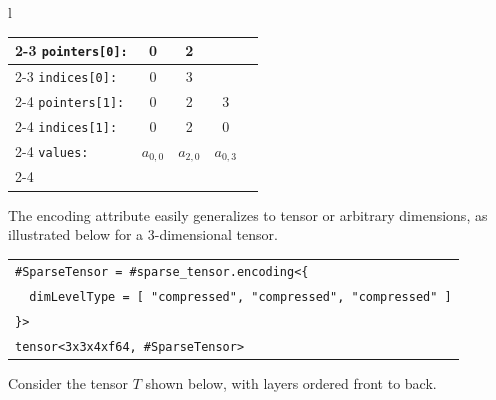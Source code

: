 \documentclass[10pt]{article}
\newcommand{\exam}{\begin{flushleft}\scriptsize\begin{tabular}{l}}
\newcommand{\maxe}{\end{tabular}\end{flushleft}}
\begin{document}
\exam
\begin{tabular}{l|c|c|c|c|}
\cline{2-3}
\texttt{pointers[0]:}  & 0 & 2 \\
\cline{2-3}
\texttt{indices[0]:}  & 0 & 3 \\
\cline{2-4}
\texttt{pointers[1]:} & 0 & 2 & 3 \\
\cline{2-4}
\texttt{indices[1]:}  & 0 & 2 & 0 \\
\cline{2-4}
\texttt{values:}    & $a_{0,0}$ & $a_{2,0}$ & $a_{0,3}$ \\
\cline{2-4}
\end{tabular}
\maxe

The encoding attribute easily generalizes to tensor or arbitrary dimensions, as illustrated below for a 3-dimensional tensor.

\exam
\verb"#SparseTensor = #sparse_tensor.encoding<{" \\
\verb+  dimLevelType = [ "compressed", "compressed", "compressed" ]+ \\
\verb"}>" \\
\verb"tensor<3x3x4xf64, #SparseTensor>" \\
\maxe
Consider the tensor $T$ shown below, with layers ordered front to back.

\begin{flushleft}
\footnotesize
{}
\end{flushleft}
\end{document}
